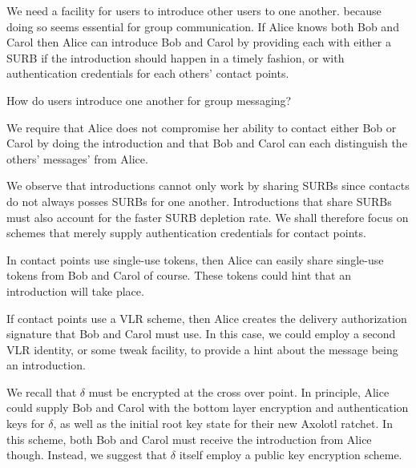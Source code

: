 We need a facility for users to introduce other users to one another.
because doing so seems essential for group communication.  If Alice 
knows both Bob and Carol then Alice can introduce Bob and Carol by
providing each with either a SURB if the introduction should happen
in a timely fashion, or with authentication credentials for each others'
contact points.  

\begin{issue}
How do users introduce one another for group messaging?
\end{issue}

We require that Alice does not compromise her ability to contact
either Bob or Carol by doing the introduction and that Bob and Carol
can each distinguish the others' messages' from Alice. 

We observe that introductions cannot only work by sharing SURBs since
contacts do not always posses SURBs for one another.  Introductions
that share SURBs must also account for the faster SURB depletion rate.
We shall therefore focus on schemes that merely supply authentication
credentials for contact points.

In contact points use single-use tokens, then Alice can easily share
single-use tokens from Bob and Carol of course.  These tokens could
hint that an introduction will take place.

If contact points use a VLR scheme, then Alice creates the delivery
authorization signature that Bob and Carol must use.  In this case,
we could employ a second VLR identity, or some tweak facility, to
provide a hint about the message being an introduction. 

We recall that $\delta$ must be encrypted at the cross over point.
In principle, Alice could supply Bob and Carol with the bottom layer
encryption and authentication keys for $\delta$, as well as the
initial root key state for their new Axolotl ratchet.  In this scheme,
both Bob and Carol must receive the introduction from Alice though.  
Instead, we suggest that $\delta$ itself employ a public key encryption
scheme.



 


